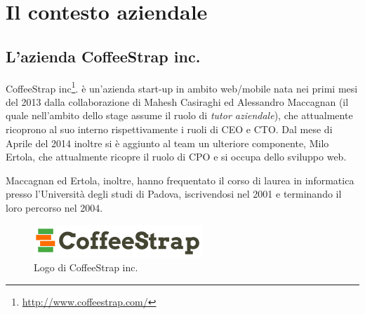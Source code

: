 
\chapter{Il contesto aziendale}
\label{cap:contesto-aziendale}

\section{L'azienda CoffeeStrap inc.}

CoffeeStrap inc\footnote{\url{http://www.coffeestrap.com/}}. è un'azienda \gls{start-up} in ambito web/mobile nata nei primi mesi del 2013 dalla collaborazione di Mahesh Casiraghi ed Alessandro Maccagnan (il quale nell'ambito dello stage assume il ruolo di \textit{tutor aziendale}), che attualmente ricoprono al suo interno rispettivamente i ruoli di \gls{CEO} e \gls{CTO}. Dal mese di Aprile del 2014 inoltre si è aggiunto al team un ulteriore componente, Milo Ertola, che attualmente ricopre il ruolo di \gls{CPO} e si occupa dello sviluppo web. 

Maccagnan ed Ertola, inoltre, hanno frequentato il corso di laurea in informatica presso l'Università degli studi di Padova, iscrivendosi nel 2001 e terminando il loro percorso nel 2004.

\begin{figure}[htp]
\centering
\includegraphics[width=\textwidth/2]{../immagini/coffeestrap-logo}
\caption{Logo di CoffeeStrap inc.}  
\end{figure}

